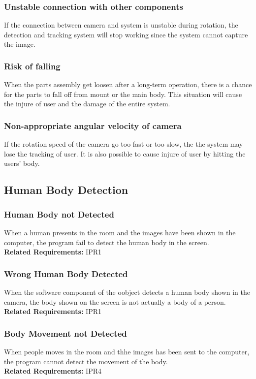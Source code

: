 \documentclass{article}
\begin{document}
\subsubsection{Unstable connection with other components}
If the connection between camera and system is unstable during rotation, the detection and tracking system will stop working since the system cannot capture the image.

\subsubsection{Risk of falling}
When the parts assembly get loosen after a long-term operation, there is a chance for the parts to fall off from mount or the main body. This situation will cause the injure of user and the damage of the entire system.

\subsubsection{Non-appropriate angular velocity of camera}
If the rotation speed of the camera go too fast or too slow, the the system may lose the tracking of user. It is also possible to cause injure of user by hitting the users' body.
\subsection{Human Body Detection}
\subsubsection{Human Body not Detected}
When a human presents in the room and the images have been shown in the computer, the program fail to detect the human body in the screen. \\
\textbf{Related Requirements: }IPR1
\subsubsection{Wrong Human Body Detected}
When the software component of the oobject detects a human body shown in the camera, the body shown on the screen is not actually a body of a person.\\
\textbf{Related Requirements: }IPR1
\subsubsection{Body Movement not Detected}
When people moves in the room and thhe images has been sent to the computer, the program cannot detect the movement of the body.\\
\textbf{Related Requirements: }IPR4
\end{document}
